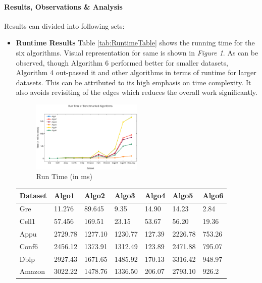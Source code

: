 \paragraph{Results, Observations \& Analysis}
Results can divided into following sets:
\begin{itemize}
\item
\textbf{Runtime Results}
Table \ref{tab:RuntimeTable} shows the running time for the six algorithms.
Visual representation for same is shown in \emph{Figure 1}.
As can be observed, though Algorithm 6 performed better for smaller datasets,
Algorithm 4 out-passed it and other algorithms in terms of runtime for larger datasets.
This can be attributed to its high emphasis on time complexity. It also avoids
revisiting of the edges which reduces the overall work significantly.
\begin{figure}[t]
    \centering
    \includegraphics[width=0.5\textwidth]{figures/RunTimeofBenchmarkedAlgorithms.eps}
    \caption{Run Time (in ms)}
    \label{fig:Run Time}
\end{figure}
\begin{table}[th]
\begin{center}
    \begin{tabular}{| l | l | l | l | l | l | l |}
    \hline
	Dataset & Algo1 & Algo2 & Algo3 & Algo4 & Algo5 & Algo6\\ \hline
    \hline
	Gre & 11.276 & 89.645 & 9.35 & 14.90 & 14.23 & \cellcolor{blue!25} 2.84\\ \hline
	Cell1 & 57.456 & 169.51 & 23.15 & 53.67 & 56.20 & \cellcolor{blue!25} 19.36\\ \hline
	Appu & 2729.78 & 1277.10 & 1230.77 & \cellcolor{blue!25} 127.39 & 2226.78 & 753.26\\ \hline
	Conf6 & 2456.12 & 1373.91 & 1312.49 & \cellcolor{blue!25} 123.89 & 2471.88 & 795.07\\ \hline
	Dblp & 2927.43 & 1671.65 & 1485.92 & \cellcolor{blue!25} 170.13 & 3316.42 & 948.97\\ \hline
	Amazon & 3022.22 & 1478.76 & 1336.50 & \cellcolor{blue!25} 206.07 & 2793.10 & 926.2\\ \hline

\end{tabular}
\end{center}
\end{table}
\end{itemize}
